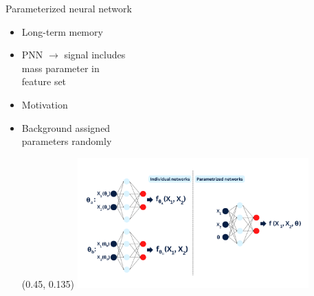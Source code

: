\documentclass[UKenglish]{beamer}
\begin{document}
\begin{frame}{Parameterized neural network}
    \begin{itemize}
        \item Long-term memory
        \item PNN $\rightarrow$ signal includes\\ mass parameter in\\ feature set
        \item Motivation
        \item Background assigned\\
        parameters randomly\\
        \begin{textblock}{0.8}(0.45, 0.135)
            \includegraphics[width = 0.7\textwidth]{figures/PNN.png}
        \end{textblock}
    \end{itemize}
\end{frame}
\end{document}
